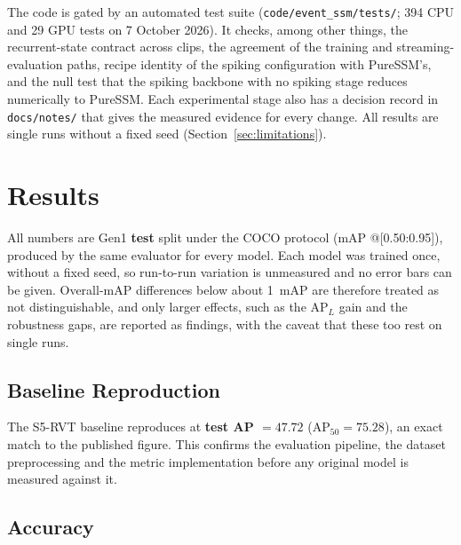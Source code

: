 \documentclass[11pt, a4paper]{report}
\begin{document}
The code is gated by an automated test suite (\texttt{code/event\_ssm/tests/}; 394 CPU and 29 GPU tests
on 7 October 2026). It checks, among other things, the recurrent-state contract across clips, the
agreement of the training and streaming-evaluation paths, recipe identity of the spiking
configuration with PureSSM's, and the null test that the spiking backbone with no spiking stage reduces numerically to
PureSSM. Each experimental stage also has a decision record in \texttt{docs/notes/} that gives the
measured evidence for every change. All results are single runs without a fixed seed
(Section~\ref{sec:limitations}).


\chapter{Results}
\label{ch:results}
All numbers are Gen1 \textbf{test} split under the COCO protocol (mAP @[0.50:0.95]), produced by the
same evaluator for every model. Each model was trained once, without a fixed seed, so run-to-run
variation is unmeasured and no error bars can be given. Overall-mAP differences below about 1~mAP are
therefore treated as not distinguishable, and only larger effects, such as the $\mathrm{AP}_L$ gain and
the robustness gaps, are reported as findings, with the caveat that these too rest on single runs.

\section{Baseline Reproduction}
\label{sec:baseline_repro}
The S5-RVT baseline reproduces at \textbf{test AP $=47.72$} ($\mathrm{AP}_{50} = 75.28$), an exact match
to the published figure. This confirms the evaluation pipeline, the dataset preprocessing and the
metric implementation before any original model is measured against it.

\section{Accuracy}
\label{sec:acc_results}
\end{document}
